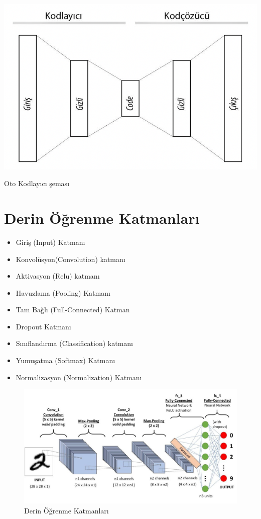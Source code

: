 \documentclass{article}
\begin{document}
\begin{multicols}{2}
\vspace{20pt}
\begin{minipage}{\linewidth}
    \includegraphics[width=0.8\linewidth]{encode.png} 
    \label{fig:Şekil 8}
\end{minipage}
\begin{center}
    Oto Kodlayıcı şeması \cite{ref6}
\end{center}
\end{multicols}

\newpage
\section{Derin Öğrenme Katmanları}


\begin{itemize}
    \item Giriş (Input) Katmanı
    \item Konvolüsyon(Convolution) katmanı
    \item Aktivasyon (Relu) katmanı
    \item Havuzlama (Pooling) Katmanı
    \item Tam Bağlı (Full-Connected) Katman
    \item Dropout Katmanı
    \item Sınıflandırma (Classification) katmanı
    \item Yumuşatma (Softmax) Katmanı
    \item Normalizasyon (Normalization) Katmanı
\end{itemize}

\begin{figure}[h]
\centering
  \includegraphics[width=13cm]{net.jpeg}
  \caption{Derin Öğrenme Katmanları \cite{ref7}}
\end{figure}
\vspace{15pt}
\end{document}

